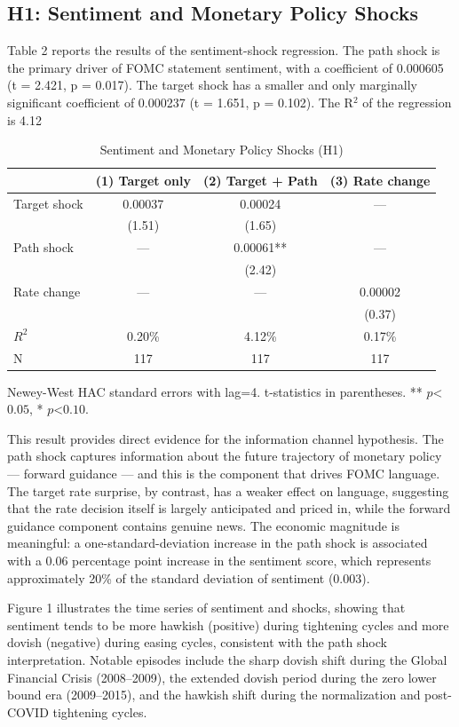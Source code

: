 \documentclass[12pt]{article}
\begin{document}
\subsection{H1: Sentiment and Monetary Policy Shocks}

Table 2 reports the results of the sentiment-shock regression. The path shock is the primary driver of FOMC statement sentiment, with a coefficient of 0.000605 (t = 2.421, p = 0.017). The target shock has a smaller and only marginally significant coefficient of 0.000237 (t = 1.651, p = 0.102). The R$^2$ of the regression is 4.12%


\begin{table}[htbp]
\centering
\caption{Sentiment and Monetary Policy Shocks (H1)}
\label{tab:h1}
\begin{tabular}{lccc}
\toprule
 & (1) Target only & (2) Target + Path & (3) Rate change \\
\midrule
Target shock & 0.00037 & 0.00024 & --- \\
 & (1.51) & (1.65) & \\
Path shock & --- & 0.00061** & --- \\
 & & (2.42) & \\
Rate change & --- & --- & 0.00002 \\
 & & & (0.37) \\
\midrule
$R^2$ & 0.20\% & 4.12\% & 0.17\% \\
N & 117 & 117 & 117 \\
\bottomrule
\end{tabular}
\footnotesize{Newey-West HAC standard errors with lag=4. t-statistics in parentheses. ** $p $<$ 0.05$, * $p $<$ 0.10$.}
\end{table}


This result provides direct evidence for the information channel hypothesis. The path shock captures information about the future trajectory of monetary policy --- forward guidance --- and this is the component that drives FOMC language. The target rate surprise, by contrast, has a weaker effect on language, suggesting that the rate decision itself is largely anticipated and priced in, while the forward guidance component contains genuine news. The economic magnitude is meaningful: a one-standard-deviation increase in the path shock is associated with a 0.06 percentage point increase in the sentiment score, which represents approximately 20\% of the standard deviation of sentiment (0.003).

Figure 1 illustrates the time series of sentiment and shocks, showing that sentiment tends to be more hawkish (positive) during tightening cycles and more dovish (negative) during easing cycles, consistent with the path shock interpretation. Notable episodes include the sharp dovish shift during the Global Financial Crisis (2008–2009), the extended dovish period during the zero lower bound era (2009–2015), and the hawkish shift during the normalization and post-COVID tightening cycles.
\end{document}
